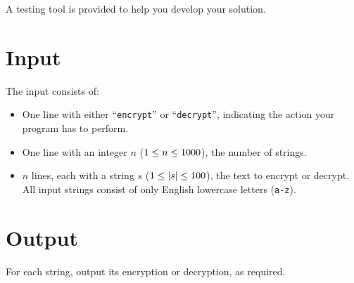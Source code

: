A testing tool is provided to help you develop your solution.

\section*{Input}

The input consists of:
\begin{itemize}
	\item One line with either ``\texttt{encrypt}'' or ``\texttt{decrypt}'',
	indicating the action your program has to perform.
	\item One line with an integer $n$ ($1 \le n \le 1000$), the number of strings.
    \item $n$ lines, each with a string $s$ ($1 \le |s| \le 100$), the text to encrypt or decrypt. \\
        All input strings consist of only English lowercase letters (\texttt{a-z}).
\end{itemize}


\section*{Output}

For each string, output its encryption or decryption, as required.
